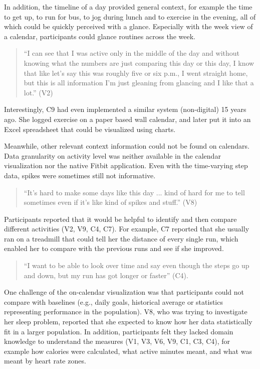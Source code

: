 \documentclass[12pt,oneside]{book}
\begin{document}
In addition, the timeline of a day provided general context, for example the time to get up, to run for bus, to jog during lunch and to exercise in the evening, all of which could be quickly perceived with a glance. Especially with the week view of a calendar, participants could glance routines across the week. 
\begin{quote}
``I can see that I was active only in the middle of the day and without knowing what the numbers are just comparing this day or this day, I know that like let’s say this was roughly five or six p.m., I went straight home, but this is all information I’m just gleaning from glancing and I like that a lot.'' (V2)
\end{quote}
Interestingly, C9 had even implemented a similar system (non-digital) 15 years ago. She logged exercise on a paper based wall calendar, and later put it into an Excel spreadsheet that could be visualized using charts.

Meanwhile, other relevant context information could not be found on calendars. Data granularity on activity level was neither available in the calendar visualization nor the native Fitbit application. Even with the time-varying step data, spikes were sometimes still not informative. 
\begin{quote}
``It{\rq}s hard to make some days like this day ... kind of hard for me to tell sometimes even if it{\rq}s like kind of spikes and stuff.'' (V8) 
\end{quote}
Participants reported that it would be helpful to identify and then compare different activities (V2, V9, C4, C7).  For example, C7 reported that she usually ran on a treadmill that could tell her the distance of every single run, which enabled her to compare with the previous runs and see if she improved. 
\begin{quote}
``I want to be able to look over time and say even though the steps go up and down, but my run has got longer or faster'' (C4).
\end{quote}
 One challenge of the on-calendar visualization was that participants could not compare with baselines (e.g., daily goals, historical average or statistics representing performance in the population).  V8, who was trying to investigate her sleep problem, reported that she expected to know how her data statistically fit in a larger population. In addition, participants felt they lacked domain knowledge to understand the measures (V1, V3, V6, V9, C1, C3, C4), for example how calories were calculated, what active minutes meant, and what was meant by heart rate zones. %
 
\end{document}
